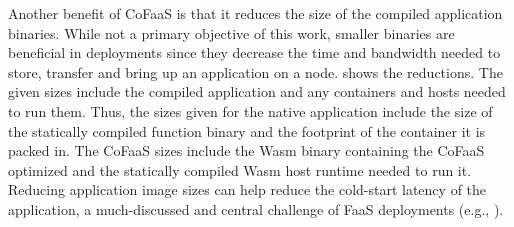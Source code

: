 Another benefit of CoFaaS is that it reduces the size of the compiled application binaries. While not a primary objective of this work, smaller binaries are beneficial in deployments since they decrease the time and bandwidth needed to store, transfer and bring up an application on a node.  shows the reductions. The given sizes include the compiled application and any containers and hosts needed to run them. Thus, the sizes given for the native application include the size of the statically compiled function binary and the footprint of the container it is packed in.  The CoFaaS sizes include the Wasm binary containing the CoFaaS optimized and the statically compiled Wasm host runtime needed to run it.  Reducing application image sizes can help reduce the cold-start latency of the application, a much-discussed and central challenge of FaaS deployments (e.g., \cite{du20_catal}). 






